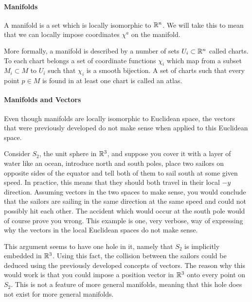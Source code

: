 \paragraph{Manifolds}
A manifold is a set which is locally isomorphic to $\mathbb{R}^{n}$. We will take this to mean that we can locally impose coordinates $\chi^{a}$ on the manifold.

More formally, a manifold is described by a number of sets $U_{i}\subset\mathbb{R}^{n}$ called charts. To each chart belongs a set of coordinate functions $\chi_{i}$ which map from a subset $M_{i}\subset M$ to $U_{i}$ such that $\chi_{i}$ is a smooth bijection. A set of charts such that every point $p\in M$ is found in at least one chart is called an atlas.

\paragraph{Manifolds and Vectors}
Even though manifolds are locally isomorphic to Euclidean space, the vectors that were previously developed do not make sense when applied to this Euclidean space.

Consider $S_{2}$, the unit sphere in $\mathbb{R}^{3}$, and suppose you cover it with a layer of water like an ocean, introduce north and south poles, place two sailors on opposite sides of the equator and tell both of them to sail south at some given speed. In practice, this means that they should both travel in their local $-y$ direction. Assuming vectors in the two spaces to make sense, you would conclude that the sailors are sailing in the same direction at the same speed and could not possibly hit each other. The accident which would occur at the south pole would of course prove you wrong. This example is one, very verbose, way of expressing why the vectors in the local Euclidean spaces do not make sense.

This argument seems to have one hole in it, namely that $S_{2}$ is implicitly embedded in $\mathbb{R}^{3}$. Using this fact, the collision between the sailors could be deduced using the previously developed concepts of vectors. The reason why this would work is that you could impose a position vector in $\mathbb{R}^{3}$ onto every point on $S_{2}$. This is not a feature of more general manifolds, meaning that this hole does not exist for more general manifolds.

